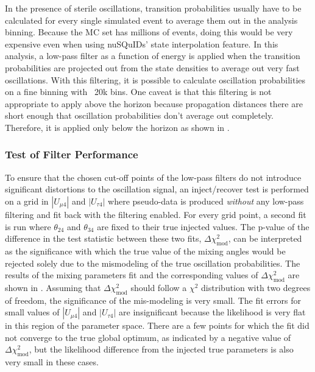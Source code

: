 In the presence of sterile oscillations, transition probabilities usually have to be calculated for every single simulated event to average them out in the analysis binning.
Because the MC set has millions of events, doing this would be very expensive even when using nuSQuIDs' state interpolation feature.
In this analysis, a low-pass filter as a function of energy is applied when the transition probabilities are projected out from the state densities to average out very fast oscillations.
With this filtering, it is possible to calculate oscillation probabilities on a fine binning with ~20k bins.
One caveat is that this filtering is not appropriate to apply above the horizon because propagation distances there are short enough that oscillation probabilities don't average out completely.
Therefore, it is applied only below the horizon as shown in .

\subsubsection{Test of Filter Performance}

To ensure that the chosen cut-off points of the low-pass filters do not introduce significant distortions to the oscillation signal, an inject/recover test is performed on a grid in $|U_{\mu 4}|$ and $|U_{\tau 4}|$ where pseudo-data is produced \emph{without} any low-pass filtering and fit back with the filtering enabled. For every grid point, a second fit is run where $\theta_{24}$ and $\theta_{34}$ are fixed to their true injected values. The p-value of the difference in the test statistic between these two fits, $\Delta \chi^2_{\mathrm{mod}}$, can be interpreted as the significance with which the true value of the mixing angles would be rejected solely due to the mismodeling of the true oscillation probabilities. The results of the mixing parameters fit and the corresponding values of $\Delta \chi^2_{\mathrm{mod}}$ are shown in . Assuming that $\Delta \chi^2_{\mathrm{mod}}$ should follow a $\chi^2$ distribution with two degrees of freedom, the significance of the mis-modeling is very small.
The fit errors for small values of $|U_{\mu 4}|$ and $|U_{\tau 4}|$ are insignificant because the likelihood is very flat in this region of the parameter space.
There are a few points for which the fit did not converge to the true global optimum, as indicated by a negative value of $\Delta \chi^2_\mathrm{mod}$, but the likelihood difference from the injected true parameters is also very small in these cases.

